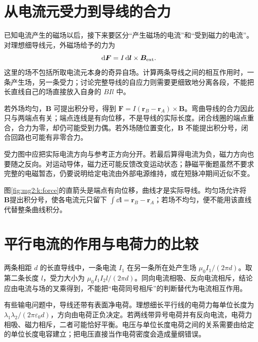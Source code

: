 \section{从电流元受力到导线的合力}
已知电流产生的磁场以后，接下来要区分“产生磁场的电流”和“受到磁力的电流”。对理想细导线元，外磁场给予的力为
\begin{equation}\mathop{}\!\mathrm d\bm F=I\mathop{}\!\mathrm d\bm l\times\bm B_{\rm ext}.\end{equation}
这里的场不包括所取电流元本身的奇异自场。计算两条导线之间的相互作用时，一条产生场，另一条受力；讨论完整导线的自应力则需要更细致地分离各段，不能把长直线自己的场直接放入自身的 $BIl$ 中。


若外场均匀，$\bm B$ 可提出积分号，得到 $\bm F=I(\bm r_B-\bm r_A)\times\bm B$。弯曲导线的合力因此只与两端点有关；端点连线是有向位移，不是导线的实际长度。闭合线圈的端点重合，合力为零，却仍可能受到力偶。若外场随位置变化，$\bm B$ 不能提出积分号，闭合回路也可能有非零合力。


受力图中应把实际电流方向与参考正方向分开。若最后算得电流为负，磁力方向也要随之反向。对运动导体，磁力还可能反馈改变运动状态；静磁平衡题虽然不要求完整的电磁暂态，仍要说明给定电流由外部电源维持，或在短脉冲期间近似不变。


图\ref{fig:mg2:k:force}的直箭头是端点有向位移，曲线才是实际导线。均匀场允许将 $\bm B$提出积分号，使各电流元只留下 $\int\dd\bm l=\bm r_B-\bm r_A$；若场不均匀，便不能用该直线代替整条曲线积分。


\section{平行电流的作用与电荷力的比较}
两条相距 $d$ 的长直导线中，一条电流 $I_1$ 在另一条所在处产生场 $\mu_0I_1/(2\pi d)$。取第二条长度 $l$，受力大小为 $\mu_0I_1I_2l/(2\pi d)$。同向电流相吸、反向电流相斥，结论应由电流与场的叉乘得到，不能把“电荷同号相斥”的判断替代为电流相互作用。


有些输电问题中，导线还带有表面净电荷。理想细长平行线的电荷力每单位长度为 $\lambda_1\lambda_2/(2\pi\varepsilon_0d)$，方向由电荷正负决定。若两线带异号电荷并有反向电流，电荷力相吸、磁力相斥，二者可能恰好平衡。电压与单位长度电荷之间的关系需要由给定的单位长度电容建立；把电压直接当作电荷密度会造成量纲错误。



